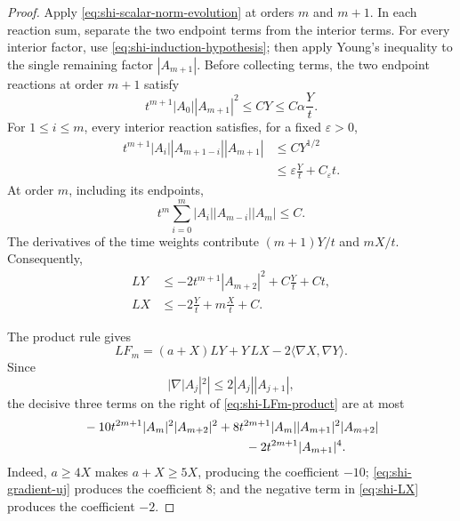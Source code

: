 \documentclass[10pt]{coll-l}
\theoremstyle{definition}
\theoremstyle{remark}
\numberwithin{section}{chapter}
\numberwithin{equation}{chapter}
\begin{document}
\begin{proof}
Apply \eqref{eq:shi-scalar-norm-evolution} at orders $m$ and $m+1$.  In
each reaction sum, separate the two endpoint terms from the interior terms.
For every interior factor, use
\eqref{eq:shi-induction-hypothesis}; then apply Young's inequality to the
single remaining factor $|A_{m+1}|$.  Before collecting terms, the two
endpoint reactions at order $m+1$ satisfy
\begin{equation}
 t^{m+1}|A_0||A_{m+1}|^2
       \leq CY\leq C\alpha\frac Yt.                      \label{eq:shi-LY-endpoints}
\end{equation}
For $1\leq i\leq m$, every interior reaction satisfies, for a fixed
$\varepsilon>0$,
\begin{align}
 t^{m+1}|A_i||A_{m+1-i}||A_{m+1}|
   &\leq C Y^{1/2}\\
   &\leq\varepsilon\frac Yt+C_\varepsilon t.             \label{eq:shi-LY-interior}
\end{align}
At order $m$, including its endpoints,
\begin{equation}
 t^m\sum_{i=0}^m|A_i||A_{m-i}||A_m|\leq C.              \label{eq:shi-LX-reactions}
\end{equation}
The derivatives of the time weights contribute $(m+1)Y/t$ and $mX/t$.
Consequently,
\begin{align}
 LY&\leq-2t^{m+1}|A_{m+2}|^2+C\frac Yt+Ct,                \label{eq:shi-LY}\\
 LX&\leq-2\frac Yt+m\frac Xt+C.                          \label{eq:shi-LX}
\end{align}

The product rule gives
\begin{equation}
 LF_m=(a+X)LY+Y\,LX-2\langle\nabla X,\nabla Y\rangle.   \label{eq:shi-LFm-product}
\end{equation}
Since
\begin{equation}
        |\nabla|A_j|^2|
            \leq2|A_j||A_{j+1}|,                         \label{eq:shi-gradient-uj}
\end{equation}
the decisive three terms on the right of
\eqref{eq:shi-LFm-product} are at most
\begin{align}
 &-10t^{2m+1}|A_m|^2|A_{m+2}|^2
   +8t^{2m+1}|A_m||A_{m+1}|^2|A_{m+2}|\notag\\
 &\hspace{13em}-2t^{2m+1}|A_{m+1}|^4.                   \label{eq:shi-three-leading-terms}
\end{align}
Indeed, $a\geq4X$ makes $a+X\geq5X$, producing the coefficient $-10$;
\eqref{eq:shi-gradient-uj} produces the coefficient $8$; and the negative
term in \eqref{eq:shi-LX} produces the coefficient $-2$.


\end{proof}
\end{document}
